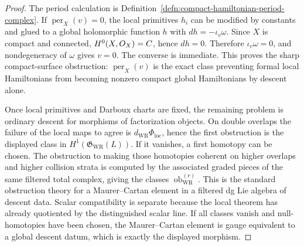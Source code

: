 \begin{proof}
  The period calculation is Definition~\ref{defn:compact-hamiltonian-period-complex}.
  If \(\operatorname{per}_X(v)=0\), the local primitives \(h_i\) can be
  modified by constants and glued to a global holomorphic function
  \(h\) with \(dh=-\iota_v\omega\).  Since \(X\) is compact and
  connected, \(H^0(X,O_X)=C\), hence \(dh=0\).  Therefore
  \(\iota_v\omega=0\), and nondegeneracy of \(\omega\) gives \(v=0\).
  The converse is immediate.  This proves the sharp compact-surface
  obstruction: \(\operatorname{per}_X(v)\) is the exact class preventing
  formal local Hamiltonians from becoming nonzero compact global
  Hamiltonians by descent alone.

  Once local primitives and Darboux charts are fixed, the remaining
  problem is ordinary descent for morphisms of factorization objects.  On
  double overlaps the failure of the local maps to agree is
  \(d_{\mathrm{WR}}\Phi_{\mathrm{loc}}\), hence the first obstruction is
  the displayed class in \(H^1(\mathfrak G_{\mathrm{WR}}(L))\).  If it
  vanishes, a first homotopy can be chosen.  The obstruction to making
  those homotopies coherent on higher overlaps and higher collision
  strata is computed by the associated graded pieces of the same filtered
  total complex, giving the classes
  \(\operatorname{ob}^{(r)}_{\mathrm{WR}}\).  This is the standard
  obstruction theory for a Maurer--Cartan element in a filtered dg Lie
  algebra of descent data.  Scalar compatibility is separate because the
  local theorem has already quotiented by the distinguished scalar line.
  If all classes vanish and null-homotopies have been chosen, the
  Maurer--Cartan element is gauge equivalent to a global descent datum,
  which is exactly the displayed morphism.
\end{proof}

